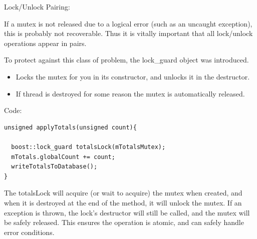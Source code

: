 \documentclass[8pt]{beamer}
\begin{document}
\begin{frame}[fragile]{Lock/Unlock Pairing:}
 
If a mutex is not released due to a logical error (such as an uncaught exception), this is probably not recoverable. Thus it is vitally important that all lock/unlock operations appear in pairs.

To protect against this class of problem, the lock\_guard object was introduced. 
\begin{itemize}
  \item Locks the mutex for you in its constructor, and unlocks it in the destructor.
  \item If thread is destroyed for some reason the mutex is automatically released.
\end{itemize}

\begin{exampleblock}{Code:}
 
\begin{lstlisting}
unsigned applyTotals(unsigned count){

  boost::lock_guard totalsLock(mTotalsMutex);
  mTotals.globalCount += count;
  writeTotalsToDatabase();
}
\end{lstlisting}

\end{exampleblock}

The totalsLock will acquire (or wait to acquire) the mutex when created, and when it is destroyed at the end of the method, it will unlock the mutex. If an exception is thrown, the lock's destructor will still be called, and the mutex will be safely released. This ensures the operation is atomic, and can safely handle error conditions.
 
\end{frame}
\end{document}
